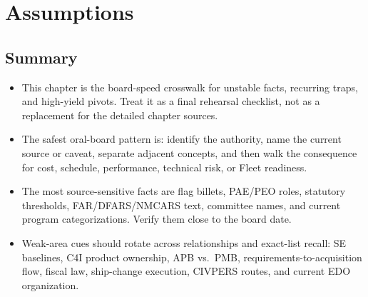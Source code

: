 \documentclass[../main.tex]{subfiles}
\begin{document}

\section{Assumptions}

\subsection{Summary}
\begin{itemize}
  \item This chapter is the board-speed crosswalk for unstable facts, recurring traps, and high-yield pivots. Treat it as a final rehearsal checklist, not as a replacement for the detailed chapter sources.
  \item The safest oral-board pattern is: identify the authority, name the current source or caveat, separate adjacent concepts, and then walk the consequence for cost, schedule, performance, technical risk, or Fleet readiness.
  \item The most source-sensitive facts are flag billets, PAE/PEO roles, statutory thresholds, FAR/DFARS/NMCARS text, committee names, and current program categorizations. Verify them close to the board date.
  \item Weak-area cues should rotate across relationships and exact-list recall: SE baselines, C4I product ownership, APB vs.\ PMB, requirements-to-acquisition flow, fiscal law, ship-change execution, CIVPERS routes, and current EDO organization.
\end{itemize}
\end{document}
